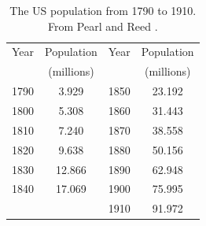 \begin{table}[htbp]
\begin{center}
\begin{tabular}{cc|cc}
Year & Population & Year & Population\\
& (millions) & & (millions)\\
\hline
1790 & 3.929 & 1850 & 23.192 \\
1800 & 5.308 & 1860 & 31.443 \\
1810 & 7.240 & 1870 & 38.558 \\
1820 & 9.638 & 1880 & 50.156 \\
1830 & 12.866 & 1890 & 62.948 \\
1840 & 17.069 & 1900 & 75.995 \\
&& 1910 & 91.972 
\end{tabular}
\caption{The US population from 1790 to 1910. From Pearl and Reed
\cite{PearlReed1920}.}
\label{table:US_population_1790_1910}
\end{center}
\end{table}

